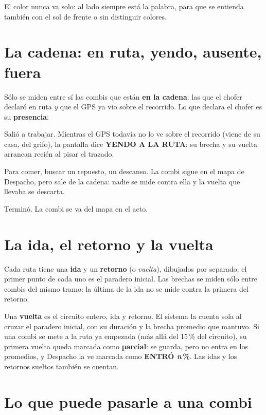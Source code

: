 \documentclass[11pt,a4paper,oneside]{book}
\newcommand{\enambar}[1]{{\color{ambar}\bfseries #1}}
\begin{document}
El color nunca va solo: al lado siempre está la palabra, para que se entienda
también con el sol de frente o sin distinguir colores.

\section{La cadena: en ruta, yendo, ausente, fuera}

Sólo se miden entre sí las combis que están \textbf{en la cadena}: las que el
chofer declaró en ruta \emph{y} que el GPS ya vio sobre el recorrido. Lo que
declara el chofer es su \textbf{presencia}:

\begin{description}[leftmargin=0pt,labelsep=0.6em,itemsep=4pt]
  \item[En ruta.] Salió a trabajar. Mientras el GPS todavía no lo ve sobre el
    recorrido (viene de su casa, del grifo), la pantalla dice
    \enambar{YENDO A LA RUTA}: su brecha y su vuelta arrancan recién al pisar
    el trazado.
  \item[Ausente.] Para comer, buscar un repuesto, un descanso. La combi sigue
    en el mapa de Despacho, pero sale de la cadena: nadie se mide contra ella
    y la vuelta que llevaba se descarta.
  \item[Fuera.] Terminó. La combi se va del mapa en el acto.
\end{description}

\section{La ida, el retorno y la vuelta}

Cada ruta tiene una \textbf{ida} y un \textbf{retorno} (o \emph{vuelta}),
dibujados por separado: el primer punto de cada uno es el paradero inicial.
Las brechas se miden sólo entre combis del mismo tramo: la última de la ida no
se mide contra la primera del retorno.

Una \textbf{vuelta} es el circuito entero, ida y retorno. El sistema la cuenta
sola al cruzar el paradero inicial, con su duración y la brecha promedio que
mantuvo. Si una combi se mete a la ruta ya empezada (más allá del 15\,\% del
circuito), su primera vuelta queda marcada como \textbf{parcial}: se guarda,
pero no entra en los promedios, y Despacho la ve marcada como \enambar{ENTRÓ
\textit{n}\,\%}. Las idas y los retornos sueltos también se cuentan.

\section{Lo que puede pasarle a una combi}
\end{document}
